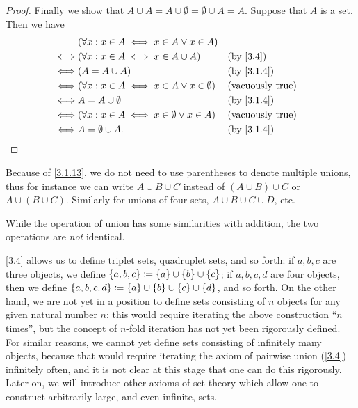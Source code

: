 \begin{proof}
  Finally we show that \(A \cup A = A \cup \emptyset = \emptyset \cup A = A\).
  Suppose that \(A\) is a set.
  Then we have
  \begin{align*}
         & (\forall x : x \in A \iff x \in A \lor x \in A)                                      \\
    \iff & (\forall x : x \in A \iff x \in A \cup A)               &  & \text{(by \cref{3.4})}  \\
    \iff & (A = A \cup A)                                          &  & \by{3.1.4}              \\
    \iff & (\forall x : x \in A \iff x \in A \lor x \in \emptyset) &  & \text{(vacuously true)} \\
    \iff & A = A \cup \emptyset                                    &  & \by{3.1.4}              \\
    \iff & (\forall x : x \in A \iff x \in \emptyset \lor x \in A) &  & \text{(vacuously true)} \\
    \iff & A = \emptyset \cup A.                                   &  & \by{3.1.4}
  \end{align*}
\end{proof}

\begin{note}
  Because of \cref{3.1.13}, we do not need to use parentheses to denote multiple unions, thus for instance we can write \(A \cup B \cup C\) instead of \((A \cup B) \cup C\) or \(A \cup (B \cup C)\).
  Similarly for unions of four sets, \(A \cup B \cup C \cup D\), etc.
\end{note}

\begin{rmk}\label{3.1.14}
  While the operation of union has some similarities with addition, the two operations are \emph{not} identical.
\end{rmk}

\begin{note}
  \cref{3.4} allows us to define triplet sets, quadruplet sets, and so forth: if \(a, b, c\) are three objects, we define \(\left\lbrace a, b, c\right\rbrace \coloneqq \left\lbrace a\right\rbrace \cup \left\lbrace b\right\rbrace \cup \left\lbrace c\right\rbrace\);
  if \(a, b, c, d\) are four objects, then we define \(\left\lbrace a, b, c, d\right\rbrace \coloneqq \left\lbrace a\right\rbrace \cup \left\lbrace b\right\rbrace \cup \left\lbrace c\right\rbrace \cup \left\lbrace d\right\rbrace\), and so forth.
  On the other hand, we are not yet in a position to define sets consisting of \(n\) objects for any given natural number \(n\);
  this would require iterating the above construction ``\(n\) times'', but the concept of \(n\)-fold iteration has not yet been rigorously defined.
  For similar reasons, we cannot yet define sets consisting of infinitely many objects, because that would require iterating the axiom of pairwise union (\cref{3.4}) infinitely often, and it is not clear at this stage that one can do this rigorously.
  Later on, we will introduce other axioms of set theory which allow one to construct arbitrarily large, and even infinite, sets.
\end{note}


